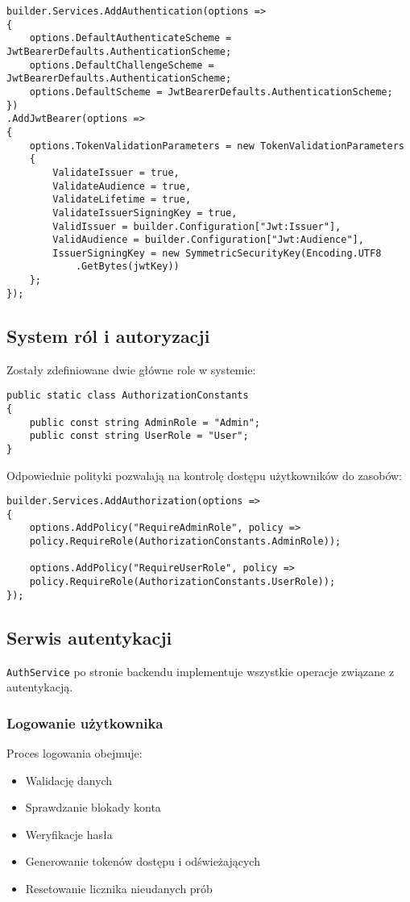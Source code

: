 \begin{lstlisting}[style=csharp, caption={Konfiguracja JWT w Program.cs}]
builder.Services.AddAuthentication(options =>
{
	options.DefaultAuthenticateScheme = JwtBearerDefaults.AuthenticationScheme;
	options.DefaultChallengeScheme = JwtBearerDefaults.AuthenticationScheme;
	options.DefaultScheme = JwtBearerDefaults.AuthenticationScheme;
})
.AddJwtBearer(options =>
{
	options.TokenValidationParameters = new TokenValidationParameters
	{
		ValidateIssuer = true,
		ValidateAudience = true,
		ValidateLifetime = true,
		ValidateIssuerSigningKey = true,
		ValidIssuer = builder.Configuration["Jwt:Issuer"],
		ValidAudience = builder.Configuration["Jwt:Audience"],
		IssuerSigningKey = new SymmetricSecurityKey(Encoding.UTF8
			.GetBytes(jwtKey))
	};
});
\end{lstlisting}

\subsection{System ról i autoryzacji}
Zostały zdefiniowane dwie główne role w systemie:

\begin{lstlisting}[style=csharp, caption={Role w systemie}]
public static class AuthorizationConstants
{
	public const string AdminRole = "Admin";
	public const string UserRole = "User";
}
\end{lstlisting}

\pagebreak

Odpowiednie polityki pozwalają na kontrolę dostępu użytkowników do zasobów:

\begin{lstlisting}[style=csharp, caption={Polityki autoryzacji}]
builder.Services.AddAuthorization(options =>
{
	options.AddPolicy("RequireAdminRole", policy =>
	policy.RequireRole(AuthorizationConstants.AdminRole));
	
	options.AddPolicy("RequireUserRole", policy =>
	policy.RequireRole(AuthorizationConstants.UserRole));
});
\end{lstlisting}

\subsection{Serwis autentykacji}
\texttt{AuthService} po stronie backendu implementuje wszystkie operacje związane z autentykacją.

\subsubsection{Logowanie użytkownika}
Proces logowania obejmuje:
\begin{itemize}
	\item Walidację danych
	\item Sprawdzanie blokady konta
	\item Weryfikacje hasła
	\item Generowanie tokenów dostępu i odświeżających
	\item Resetowanie licznika nieudanych prób
\end{itemize}


